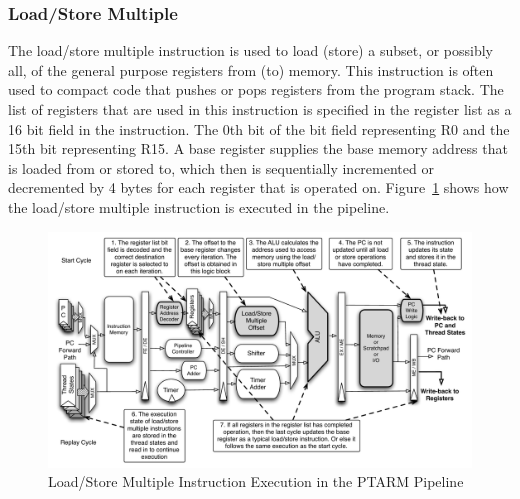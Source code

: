\subsubsection{Load/Store Multiple}
The load/store multiple instruction is used to load (store) a subset, or possibly all, of the general purpose registers from (to) memory.
This instruction is often used to compact code that pushes or pops registers from the program stack.
The list of registers that are used in this instruction is specified in the register list as a 16 bit field in the instruction.
The 0th bit of the bit field representing R0 and the 15th bit representing R15.
A base register supplies the base memory address that is loaded from or stored to, which then is sequentially incremented or decremented by 4 bytes for each register that is operated on. 
Figure~\ref{fig:ldstrm_pipeline_implementation} shows how the load/store multiple instruction is executed in the pipeline. 

\begin{figure}
  \vspace{-20pt}
  \begin{center}
    \includegraphics[scale=.54]{figs/ldstrm_pipeline_implementation}
  \end{center}
  \vspace{-20pt}
  \caption{Load/Store Multiple Instruction Execution in the PTARM Pipeline}
  \label{fig:ldstrm_pipeline_implementation}
\end{figure}

